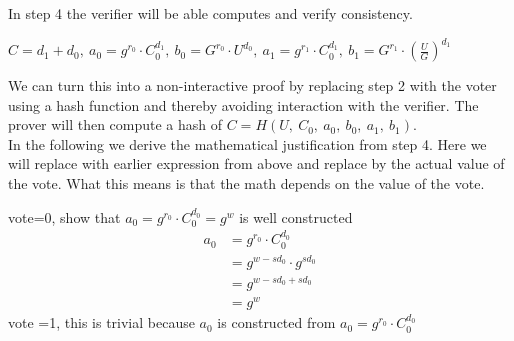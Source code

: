 \noindent
In step 4 the verifier will be able computes and verify consistency.

\noindent
\begin{infobox}[Step 4]
\begin{math}C = d_1 + d_0,\ a_0=g^{r_0}  \cdot  C^{d_1}_0,\ b_0 = G^{r_0} \cdot U^{d_0},\ a_1=g^{r_1}  \cdot  C^{d_1}_0,\ b_1= G^{r_1}  \cdot (\frac{U}{G})^{d_1}\end{math}
\end{infobox}

 We can turn this into a non-interactive proof by replacing step 2 with the voter using a hash function and thereby avoiding interaction with the verifier. The prover will then compute a hash of \begin{math}C=H(U,\ C_0,\ a_0,\ b_0,\ a_1,\ b_1) \end{math}.\\

 In the following we derive the mathematical justification from step 4. Here we will replace with earlier expression from above and replace by the actual value of the vote. What this means is that the math depends on the value of the vote.\\



\begin{infobox}[Explanation of \begin{math}a_0=g^{r_0}  \cdot  C^{d_1}_0\end{math}]
vote=0, show that \begin{math}a_0=g^{r_0}  \cdot  C^{d_0}_0 = g^w \end{math} is well constructed
\begin{align*}
    a_0 &=g^{r_0}  \cdot  C^{d_0}_0     \\ 
        &= g^{w-sd_0} \cdot  g^{sd_0}   \\
        &= g^{w-sd_0+ sd_0}             \\
        &= g^w                          
\end{align*}
vote =1, this is trivial because \begin{math}a_0 \end{math}  is constructed from \begin{math}a_0=g^{r_0}  \cdot  C^{d_0}_0 \end{math}
\end{infobox}


